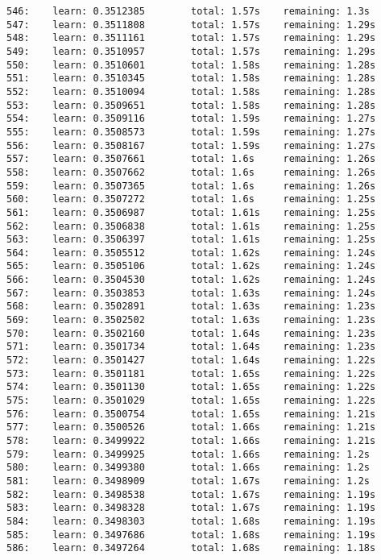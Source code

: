 \documentclass[11pt]{article}
\begin{document}
\begin{Verbatim}[commandchars=\\\{\}]
546:    learn: 0.3512385        total: 1.57s    remaining: 1.3s
547:    learn: 0.3511808        total: 1.57s    remaining: 1.29s
548:    learn: 0.3511161        total: 1.57s    remaining: 1.29s
549:    learn: 0.3510957        total: 1.57s    remaining: 1.29s
550:    learn: 0.3510601        total: 1.58s    remaining: 1.28s
551:    learn: 0.3510345        total: 1.58s    remaining: 1.28s
552:    learn: 0.3510094        total: 1.58s    remaining: 1.28s
553:    learn: 0.3509651        total: 1.58s    remaining: 1.28s
554:    learn: 0.3509116        total: 1.59s    remaining: 1.27s
555:    learn: 0.3508573        total: 1.59s    remaining: 1.27s
556:    learn: 0.3508167        total: 1.59s    remaining: 1.27s
557:    learn: 0.3507661        total: 1.6s     remaining: 1.26s
558:    learn: 0.3507662        total: 1.6s     remaining: 1.26s
559:    learn: 0.3507365        total: 1.6s     remaining: 1.26s
560:    learn: 0.3507272        total: 1.6s     remaining: 1.25s
561:    learn: 0.3506987        total: 1.61s    remaining: 1.25s
562:    learn: 0.3506838        total: 1.61s    remaining: 1.25s
563:    learn: 0.3506397        total: 1.61s    remaining: 1.25s
564:    learn: 0.3505512        total: 1.62s    remaining: 1.24s
565:    learn: 0.3505106        total: 1.62s    remaining: 1.24s
566:    learn: 0.3504530        total: 1.62s    remaining: 1.24s
567:    learn: 0.3503853        total: 1.63s    remaining: 1.24s
568:    learn: 0.3502891        total: 1.63s    remaining: 1.23s
569:    learn: 0.3502502        total: 1.63s    remaining: 1.23s
570:    learn: 0.3502160        total: 1.64s    remaining: 1.23s
571:    learn: 0.3501734        total: 1.64s    remaining: 1.23s
572:    learn: 0.3501427        total: 1.64s    remaining: 1.22s
573:    learn: 0.3501181        total: 1.65s    remaining: 1.22s
574:    learn: 0.3501130        total: 1.65s    remaining: 1.22s
575:    learn: 0.3501029        total: 1.65s    remaining: 1.22s
576:    learn: 0.3500754        total: 1.65s    remaining: 1.21s
577:    learn: 0.3500526        total: 1.66s    remaining: 1.21s
578:    learn: 0.3499922        total: 1.66s    remaining: 1.21s
579:    learn: 0.3499925        total: 1.66s    remaining: 1.2s
580:    learn: 0.3499380        total: 1.66s    remaining: 1.2s
581:    learn: 0.3498909        total: 1.67s    remaining: 1.2s
582:    learn: 0.3498538        total: 1.67s    remaining: 1.19s
583:    learn: 0.3498328        total: 1.67s    remaining: 1.19s
584:    learn: 0.3498303        total: 1.68s    remaining: 1.19s
585:    learn: 0.3497686        total: 1.68s    remaining: 1.19s
586:    learn: 0.3497264        total: 1.68s    remaining: 1.18s

\end{Verbatim}
\end{document}
